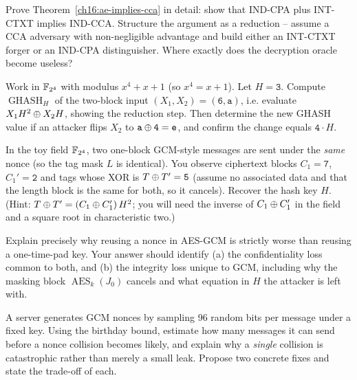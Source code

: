\begin{exercise}
Prove Theorem~\ref{ch16:ae-implies-cca} in detail: show that IND-CPA plus INT-CTXT implies IND-CCA. Structure the argument as a reduction -- assume a CCA adversary with non-negligible advantage and build either an INT-CTXT forger or an IND-CPA distinguisher. Where exactly does the decryption oracle become useless?
\end{exercise}

\begin{exercise}
Work in $\mathbb{F}_{2^4}$ with modulus $x^4 + x + 1$ (so $x^4 = x+1$). Let $H = \texttt{3}$. Compute $\operatorname{GHASH}_H$ of the two-block input $(X_1, X_2) = (\texttt{6}, \texttt{a})$, i.e. evaluate $X_1 H^2 \oplus X_2 H$, showing the reduction step. Then determine the new GHASH value if an attacker flips $X_2$ to $\texttt{a} \oplus \texttt{4} = \texttt{e}$, and confirm the change equals $\texttt{4} \cdot H$.
\end{exercise}

\begin{exercise}
In the toy field $\mathbb{F}_{2^4}$, two one-block GCM-style messages are sent under the \emph{same} nonce (so the tag mask $L$ is identical). You observe ciphertext blocks $C_1 = \texttt{7}$, $C_1' = \texttt{2}$ and tags whose XOR is $T \oplus T' = \texttt{5}$ (assume no associated data and that the length block is the same for both, so it cancels). Recover the hash key $H$. (Hint: $T \oplus T' = (C_1 \oplus C_1')\,H^2$; you will need the inverse of $C_1 \oplus C_1'$ in the field and a square root in characteristic two.)
\end{exercise}

\begin{exercise}
Explain precisely why reusing a nonce in AES-GCM is strictly worse than reusing a one-time-pad key. Your answer should identify (a) the confidentiality loss common to both, and (b) the integrity loss unique to GCM, including why the masking block $\operatorname{AES}_k(J_0)$ cancels and what equation in $H$ the attacker is left with.
\end{exercise}

\begin{exercise}
A server generates GCM nonces by sampling 96 random bits per message under a fixed key. Using the birthday bound, estimate how many messages it can send before a nonce collision becomes likely, and explain why a \emph{single} collision is catastrophic rather than merely a small leak. Propose two concrete fixes and state the trade-off of each.
\end{exercise}


